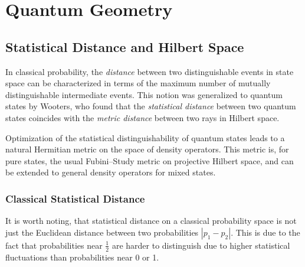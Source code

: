 \chapter{Quantum Geometry}
\label{chap:quantumGeometry}

\section{Statistical Distance and Hilbert Space}
\label{sec:statisticalDistance}
%


In classical probability, the \emph{distance} between two distinguishable 
events in state space can be characterized in terms of the maximum number
of mutually distinguishable intermediate events.  This notion was 
generalized to quantum states by Wooters\cite{Wooters:81}, who found
that the \emph{statistical distance} between two quantum states coincides with
the \emph{metric distance} between two rays in Hilbert space.

Optimization of the statistical distinguishability of quantum
states leads to a natural Hermitian metric on the space of density
operators\cite{Braunstein/Caves:94}.  This metric is, for pure states,
the usual Fubini--Study metric on projective Hilbert space\cite{Gibbons:92},
and can be extended to general density operators for mixed 
states\cite{Braunstein/Caves:94}.

\subsection{Classical Statistical Distance}

It is worth noting, that statistical distance on a classical probability space 
is not just the Euclidean distance between two probabilities $|p_1-p_2|$.  
This is due to the fact that probabilities near $\frac{1}{2}$ are harder 
to distinguish due to higher statistical fluctuations than probabilities 
near 0 or 1.

